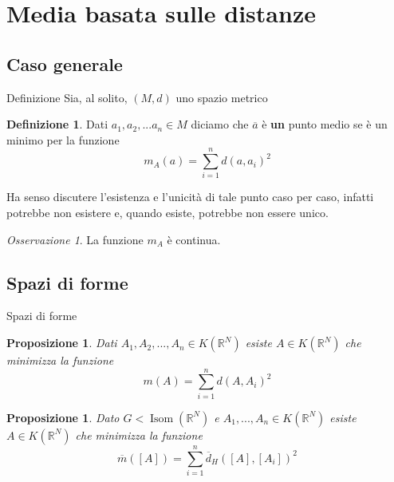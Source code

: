 \documentclass{beamer}
\newcounter{counter1}
\theoremstyle{plain}
\newtheorem{mypro}[counter1]{Proposizione}
\theoremstyle{definition}
\newtheorem{mydef}[counter1]{Definizione}
\theoremstyle{remark}
\newtheorem{myoss}[counter1]{Osservazione}
\newcommand{\obar}[1]{\overline{#1}}
\newcommand{\bra}[1]{\left[#1\right]}
\DeclareMathOperator{\isom}{Isom}
\begin{document}
\section{Media basata sulle distanze}

\subsection{Caso generale}

\begin{frame}{Definizione}
  Sia, al solito, $(M,d)$ uno spazio metrico
  \begin{mydef}
    Dati $a_1,a_2,... a_n \in M$ diciamo che $\obar a$ è \textbf{un}
    punto medio se è un minimo per la funzione
    \[ m_A (a) = \sum _{i = 1} ^n d(a,a_i)^2 \]
  \end{mydef}
  
  Ha senso discutere l'esistenza e l'unicità di tale punto caso per
  caso, infatti potrebbe non esistere e, quando esiste, potrebbe non
  essere unico.

  \begin{myoss}
    La funzione $m_A$ è continua.
  \end{myoss}
\end{frame}

\subsection{Spazi di forme}

\begin{frame}{Spazi di forme}
  \begin{mypro}
    Dati $A_1, A_2,..., A_n \in K(\mathbb{R}^N)$ esiste $A \in
    K(\mathbb{R}^N)$ che minimizza la funzione
    \[ m(A) = \sum _{i =1} ^n d(A,A_i)^2 \]
  \end{mypro}

  \begin{mypro}
    Dato $G < \isom (\mathbb{R}^N)$ e $A_1,...,A_n \in K(\mathbb{R}^N)$
    esiste $A \in K(\mathbb{R}^N)$ che minimizza la funzione 
    \[ \obar m(\bra{A}) = \sum _{i =1} ^n \obar
    d_H(\bra{A},\bra{A_i})^2 \]
  \end{mypro}
\end{frame}
\end{document}
